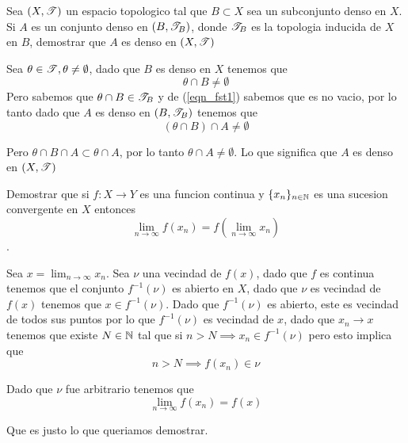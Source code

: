 \documentclass[../main.tex]{subfiles}
\begin{document}
\begin{problem}
  Sea $(X, \mathscr{T})$ un espacio topologico tal que $B \subset X$ sea un subconjunto denso en $X$. Si
  $A$ es un conjunto denso en $(B, \mathscr{T}_{B})$, donde $\mathscr{T}_{B}$ es la topologia inducida de $X$ en $B$, demostrar que $A$ es denso en $(X, \mathscr{T})$
\end{problem}
\begin{solution}
  Sea $\theta \in \mathscr{T}, \theta \neq \emptyset$, dado que $B$ es denso en $X$ tenemos que
  \begin{equation}
    \label{eqn_fst1}
    \theta \cap B \neq \emptyset
  \end{equation}
  Pero sabemos que $\theta \cap B \in \mathscr{T}_{B}$ y de (\ref{eqn_fst1}) sabemos que es no vacio, por lo tanto dado que $A$ es denso en $(B, \mathscr{T}_{B})$ tenemos que
  \begin{equation*}
    (\theta \cap B) \cap A \neq \emptyset
  \end{equation*}

  Pero $\theta \cap B \cap A \subset \theta \cap A$, por lo tanto $\theta \cap A \neq \emptyset$.
  Lo que significa que $A$ es denso en $(X, \mathscr{T})$
\end{solution}

\begin{problem}
  Demostrar que si $f : X \to Y$ es una funcion continua y $\{x_n\}_{n \in \mathbb{N}}$ es una sucesion convergente en $X$ entonces
  \begin{equation*}
    \lim_{n \to \infty} f(x_{n}) = f(\lim_{n \to \infty} x_{n})
  \end{equation*}.
\end{problem}
\begin{solution}
  Sea $x = \lim_{n \to \infty} x_{n}$. Sea $\nu$ una vecindad de $f(x)$, dado que $f$ es continua tenemos que el conjunto $f^{-1}(\nu)$ es abierto en $X$, dado que $\nu$ es vecindad de $f(x)$ tenemos que $x \in f^{-1}(\nu)$. Dado que $f^{-1}(\nu)$ es abierto, este es vecindad de todos sus puntos por lo que $f^{-1}(\nu)$ es vecindad de $x$, dado que $x_{n} \to x$ tenemos que existe $N \in \mathbb{N}$ tal que si $n > N \implies x_{n} \in f^{-1}(\nu)$ pero esto implica que
  \begin{equation*}
    n > N \implies f(x_{n}) \in \nu
  \end{equation*}

  Dado que $\nu$ fue arbitrario tenemos que
  \begin{equation*}
    \lim_{n \to \infty} f(x_{n}) = f(x)
  \end{equation*}

  Que es justo lo que queriamos demostrar.
\end{solution}
\end{document}
